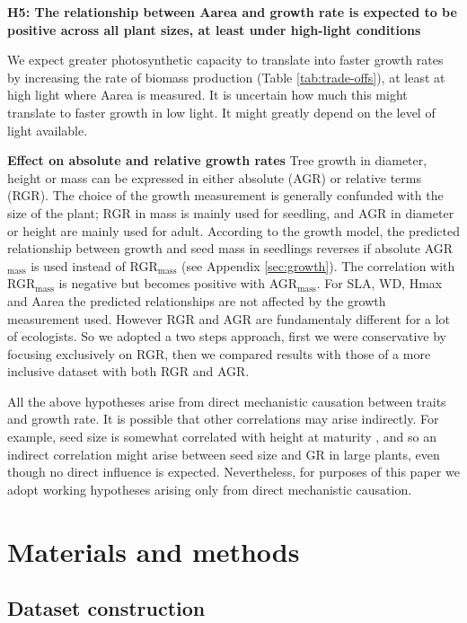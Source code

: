 \documentclass[a4paper,11pt]{article}
\begin{document}
\textbf{H5: The relationship between Aarea and growth rate is expected to be positive across all plant sizes, at least under high-light conditions}

We expect greater photosynthetic capacity to translate into faster growth rates by increasing the rate of biomass production (Table \ref{tab:trade-offs}), at least at high light where Aarea is measured. It is uncertain how much this might translate to faster growth in low light. It might greatly depend on the level of light available.

\textbf{Effect on absolute and relative growth rates}
Tree growth in diameter, height or mass can be expressed in either absolute (AGR) or relative terms (RGR). The choice of the growth measurement is generally confunded with the size of the plant; RGR in mass is mainly used for seedling, and AGR in diameter or height are mainly used for adult. According to the growth model, the predicted relationship between growth and seed mass in seedlings reverses if absolute AGR$_\textrm{mass}$ is used instead of RGR$_\textrm{mass}$ (see Appendix \ref{sec:growth}). The correlation with RGR$_\textrm{mass}$ is negative but becomes positive with AGR$_\textrm{mass}$. For SLA, WD, Hmax and Aarea the predicted relationships are not affected by the growth measurement used. However RGR and AGR are fundamentaly different for a lot of ecologists. So we adopted a two steps approach, first we were conservative by focusing exclusively on RGR, then we compared results with those of a more inclusive dataset with both RGR and AGR.

All the above hypotheses arise from direct mechanistic causation between traits and growth rate. It is possible that other correlations may arise indirectly. For example, seed size is somewhat correlated with height at maturity \citep{Westoby:2009ch}, and so an indirect correlation might arise between seed size and GR in large plants, even though no direct influence is expected. Nevertheless, for purposes of this paper we adopt working hypotheses arising only from direct mechanistic causation. 

\section*{Materials and methods}\label{material-and-methods}

\subsection*{Dataset construction}\label{data-construction}
\end{document}
